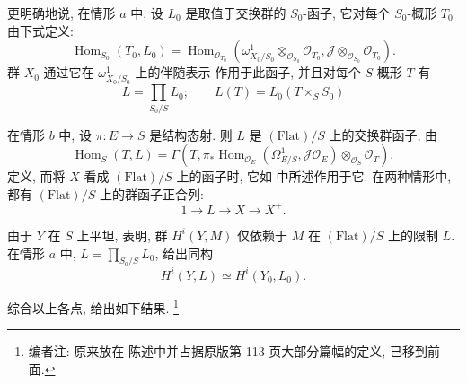 更明确地说, 在情形 \(a\) 中, 设 \(L_0\) 是取值于交换群的
\(S_0\)-函子, 它对每个 \(S_0\)-概形 \(T_0\) 由下式定义:
\[
 \operatorname{Hom}_{S_0}(T_0,L_0)
 =\operatorname{Hom}_{\mathscr O_{T_0}}
 \left(
  \omega^1_{X_0/S_0}\otimes_{\mathscr O_{S_0}}\mathscr O_{T_0},
  \mathscr J\otimes_{\mathscr O_{S_0}}\mathscr O_{T_0}
 \right).
\]
群 \(X_0\) 通过它在 \(\omega^1_{X_0/S_0}\) 上的伴随表示
作用于此函子, 并且对每个 \(S\)-概形 \(T\) 有
\[
 L=\prod_{S_0/S}L_0;
 \qquad L(T)=L_0(T\times_S S_0)
\]

在情形 \(b\) 中, 设 \(\pi:E\to S\) 是结构态射.
则 \(L\) 是 \((\mathrm{Flat})/S\) 上的交换群函子, 由
\[
 \operatorname{Hom}_S(T,L)
 =\Gamma\!\left(
  T,
  \pi_*\operatorname{Hom}_{\mathscr O_E}
   (\Omega^1_{E/S},\mathscr J\mathscr O_E)
  \otimes_{\mathscr O_S}\mathscr O_T
 \right),
\]
定义, 而将 \(X\) 看成 \((\mathrm{Flat})/S\) 上的函子时,
它如  中所述作用于它.
在两种情形中, 都有 \((\mathrm{Flat})/S\) 上的群函子正合列:
\[
 \tag{E}\label{sga3:iii:paragraph:2-0:equation:e}
 1\longrightarrow L\longrightarrow X\longrightarrow X^+.
\]

由于 \(Y\) 在 \(S\) 上平坦, 
表明, 群 \(H^i(Y,M)\) 仅依赖于 \(M\) 在
\((\mathrm{Flat})/S\) 上的限制 \(L\). 在情形 \(a\) 中,
\(L=\prod_{S_0/S}L_0\), 
给出同构
\[
 H^i(Y,L)\simeq H^i(Y_0,L_0).
\]

综合以上各点, 
给出如下结果.
\footnote{编者注: 原来放在 
陈述中并占据原版第 113 页大部分篇幅的定义, 已移到前面.}

